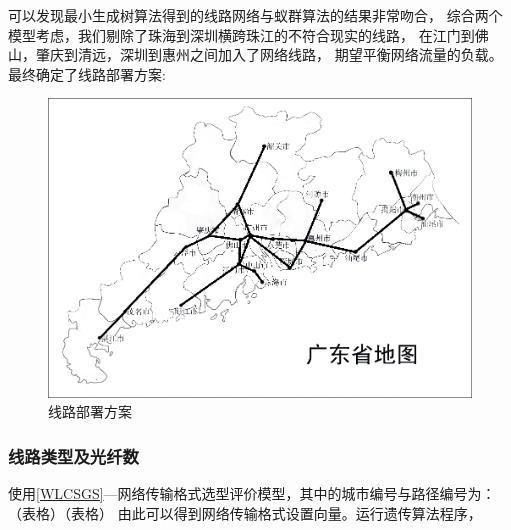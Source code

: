 \documentclass[UTF8,12pt]{ctexart}
\begin{document}
            可以发现最小生成树算法得到的线路网络与蚁群算法的结果非常吻合，
            综合两个模型考虑，我们剔除了珠海到深圳横跨珠江的不符合现实的线路，
            在江门到佛山，肇庆到清远，深圳到惠州之间加入了网络线路，
            期望平衡网络流量的负载。最终确定了线路部署方案:
            \begin{figure}[H]
                \centering
                \includegraphics[scale=0.6]{over.png}   %
                \caption{线路部署方案}
                \end{figure}

        \subsubsection{线路类型及光纤数}
            使用\ref{WLCSGS}—网络传输格式选型评价模型，其中的城市编号与路径编号为：
            （表格）（表格）
            由此可以得到网络传输格式设置向量。运行遗传算法程序，
            
\end{document}
